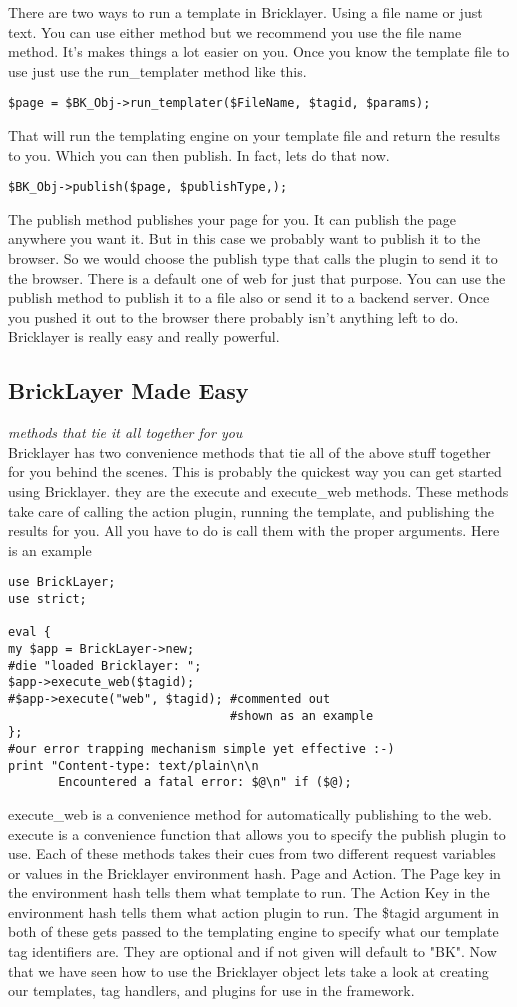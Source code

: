 \documentclass[letterpaper,10pt,oneside]{book}
\begin{document}
\par
There are two ways to run a template in Bricklayer. Using a file name or just text. You can use either method but we recommend you use the file name method. It's makes things a lot easier on you. Once you know the template file to use just use the run\_templater method like this.
\begin{verbatim}
$page = $BK_Obj->run_templater($FileName, $tagid, $params);
\end{verbatim}
That will run the templating engine on your template file and return the results to you. Which you can then publish. In fact, lets do that now.
\begin{verbatim}
$BK_Obj->publish($page, $publishType,);
\end{verbatim}
The publish method publishes your page for you. It can publish the page anywhere you want it. But in this case we probably want to publish it to the browser. So we would choose the publish type that calls the plugin to send it to the browser. There is a default one of web for just that purpose. You can use the publish method to publish it to a file also or send it to a backend server. Once you pushed it out to the browser there probably isn't anything left to do. Bricklayer is really easy and really powerful.
\subsection*{BrickLayer Made Easy}
\textit{methods that tie it all together for you}\\
Bricklayer has two convenience methods that tie all of the above stuff together for you behind the scenes. This is probably the quickest way you can get started using Bricklayer. they are the execute and execute\_web methods. These methods take care of calling the action plugin, running the template, and publishing the results for you. All you have to do is call them with the proper arguments. Here is an example
\begin{verbatim}
use BrickLayer;
use strict;

eval {
my $app = BrickLayer->new;
#die "loaded Bricklayer: ";
$app->execute_web($tagid);
#$app->execute("web", $tagid); #commented out
                               #shown as an example
};
#our error trapping mechanism simple yet effective :-)
print "Content-type: text/plain\n\n
       Encountered a fatal error: $@\n" if ($@);
\end{verbatim}
execute\_web is a convenience method for automatically publishing to the web. execute is a convenience function that allows you to specify the publish plugin to use. Each of these methods takes their cues from two different request variables or values in the Bricklayer environment hash. Page and Action. The Page key in the environment hash tells them what template to run. The Action Key in the environment hash tells them what action plugin to run. The \$tagid argument in both of these gets passed to the templating engine to specify what our template tag identifiers are. They are optional and if not given will default to "BK". Now that we have seen how to use the Bricklayer object lets take a look at creating our templates, tag handlers, and plugins for use in the framework.



\end{document}
